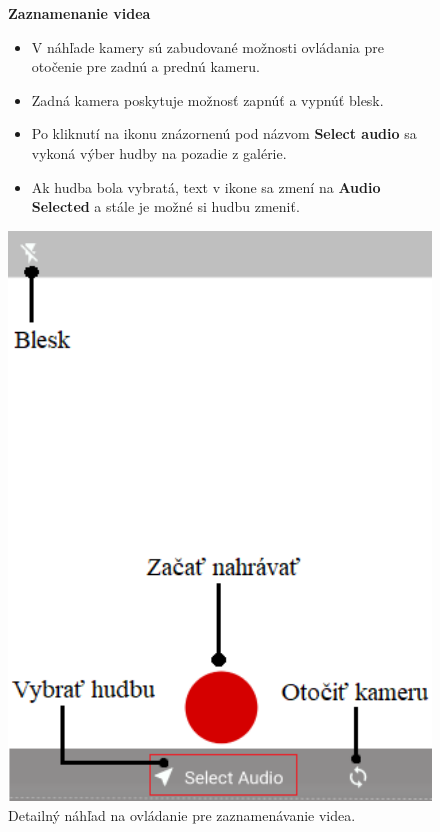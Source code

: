 \documentclass[12pt, oneside]{book}
\begin{document}
\begin{figure}[H]
\begin{minipage}[b]{0.55\linewidth}

    \hspace{15pt} \textbf{Zaznamenanie videa}

    \begin{itemize}
        \item V náhľade kamery sú zabudované možnosti ovládania pre otočenie pre zadnú a prednú kameru.
        \item Zadná kamera poskytuje možnosť zapnúť a vypnúť blesk.
        \item Po kliknutí na ikonu znázornenú pod názvom \textbf{Select audio} sa vykoná výber hudby na pozadie z galérie.
        \item Ak hudba bola vybratá, text v ikone sa zmení na \textbf{Audio Selected} a stále je možné si hudbu zmeniť.
    \end{itemize}

   

    \hspace{15pt} 
    
\end{minipage}
\hspace{0.5cm}
\begin{minipage}[b]{0.35\linewidth}
  \includegraphics[width=1\textwidth]{images/rec.png}
    \caption{Detailný náhľad na ovládanie pre zaznamenávanie videa. }
    \label{fig:obr11}
\end{minipage}



\end{figure}
\end{document}
